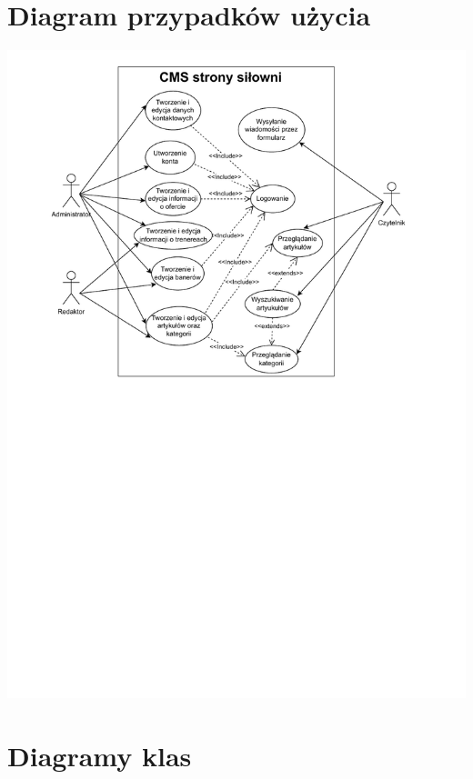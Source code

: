\documentclass[12pt]{article}
\begin{document}
\section{Diagram przypadków użycia}
\includegraphics[width=1\textwidth, angle=0]{images/Przypadki_uzycia.pdf}
\newpage
\section{Diagramy klas}
\end{document}
